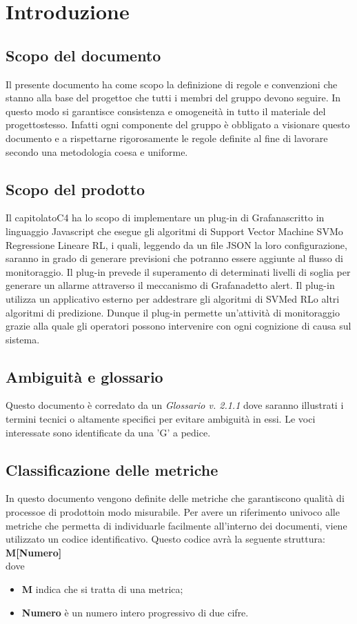 \section{Introduzione}
\subsection{Scopo del documento}
Il presente documento ha come scopo la definizione di regole e convenzioni che stanno alla base del progetto\glosp e che tutti i membri del gruppo devono seguire. In questo modo si garantisce consistenza e omogeneità in tutto il materiale del progetto\glosp stesso. Infatti ogni componente del gruppo è obbligato a visionare questo documento e a rispettarne rigorosamente le regole definite al fine di lavorare secondo una metodologia coesa e uniforme.
\subsection{Scopo del prodotto}
Il capitolato\glosp C4 ha lo scopo di implementare un plug-in di Grafana\glosp scritto in linguaggio Javascript che esegue gli algoritmi di Support Vector Machine SVM\glosp o Regressione Lineare RL\glo, i quali, leggendo da un file JSON la loro configurazione, saranno in grado di generare previsioni che potranno essere aggiunte al flusso di monitoraggio. Il plug-in prevede il superamento di determinati livelli di soglia per generare un allarme attraverso il meccanismo di Grafana\glosp detto alert\glo. Il plug-in utilizza un applicativo esterno per addestrare gli algoritmi di SVM\glosp ed RL\glosp o altri algoritmi di predizione.
Dunque il plug-in permette un'attività di monitoraggio grazie alla quale gli operatori possono intervenire con ogni cognizione di causa sul sistema.
\subsection{Ambiguità e glossario}
Questo documento è corredato da un \textit{Glossario v. 2.1.1} dove saranno illustrati i termini tecnici o altamente specifici per evitare ambiguità in essi. Le voci interessate sono identificate da una 'G' a pedice.
\subsection{Classificazione delle metriche}
In questo documento vengono definite delle metriche che garantiscono qualità di processo\glosp e di prodotto\glosp in modo misurabile.
Per avere un riferimento univoco alle metriche che permetta di individuarle facilmente all'interno dei documenti, viene utilizzato un codice identificativo. Questo codice avrà la seguente struttura: \\
\textbf{M[Numero]} \\
dove 
\begin{itemize}
	\item \textbf{M} indica che si tratta di una metrica;
	\item \textbf{Numero} è un numero intero progressivo di due cifre.
\end{itemize}
